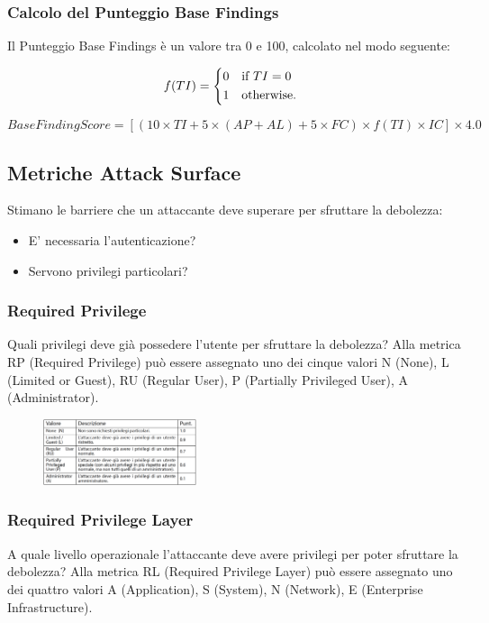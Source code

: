 \subsubsection{Calcolo del Punteggio Base Findings}
Il Punteggio Base Findings è un valore tra 0 e 100,
calcolato nel modo seguente:

\[f(TI) = \begin{dcases*}
        0 & if $TI = 0$\\
        1 & otherwise. 
        \end{dcases*}
        \]
        
\[BaseFindingScore = [(10 \times TI + 5 \times(AP + AL)+5 \times FC) \times f(TI) \times IC] \times 4.0\]

\subsection{Metriche Attack Surface}
Stimano le barriere che un attaccante deve superare
per sfruttare la debolezza:
\begin{itemize}
    \item E’ necessaria l’autenticazione?
    \item Servono privilegi particolari?
\end{itemize}
\subsubsection{Required Privilege}
Quali privilegi deve già possedere l’utente
per sfruttare la debolezza? Alla metrica RP (Required Privilege) può essere
assegnato uno dei cinque valori
N (None), L (Limited or Guest), RU (Regular User),
P (Partially Privileged User), A (Administrator).

\begin{figure}[hbpt!]
    \centering
    \includegraphics[width=0.4\textwidth]{./Images/cap3/3.9.png}
\end{figure}
\FloatBarrier

\subsubsection{Required Privilege Layer}
A quale livello operazionale l’attaccante deve avere
privilegi per poter sfruttare la debolezza? Alla metrica RL (Required Privilege Layer) può essere
assegnato uno dei quattro valori
A (Application), S (System), N (Network), E (Enterprise Infrastructure).

